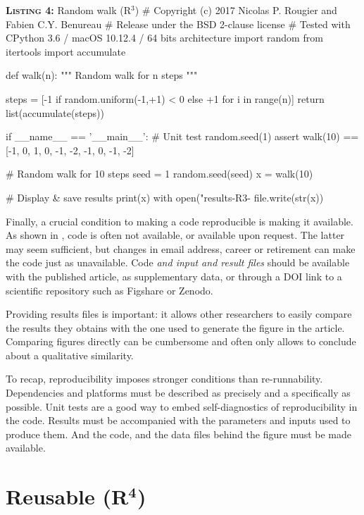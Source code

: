 \documentclass[a4paper,11pt]{article}
\begin{document}

\begin{code}{\textbf{\textsc{Listing 4:}} Random walk (R$^3$)}
# Copyright (c) 2017 Nicolas P. Rougier and Fabien C.Y. Benureau
# Release under the BSD 2-clause license
# Tested with CPython 3.6 / macOS 10.12.4 / 64 bits architecture
import random
from itertools import accumulate

def walk(n):
    """ Random walk for n steps """
  
    steps = [-1 if random.uniform(-1,+1) < 0 else +1 for i in range(n)]
    return list(accumulate(steps))

if __name__ == '__main__':
    # Unit test
    random.seed(1)
    assert walk(10) == [-1, 0, 1, 0, -1, -2, -1, 0, -1, -2]

    # Random walk for 10 steps
    seed = 1
    random.seed(seed)
    x = walk(10)
    
    # Display & save results
    print(x)
    with open("results-R3-%
        file.write(str(x))
\end{code}

Finally, a crucial condition to making a code reproducible is making it available. As shown in \citep{Collberg:2016}, code is often not available, or available upon request. The latter may seem sufficient, but changes in email address,  career or retirement can make the code just as unavailable. Code \emph{and input and result files} should be available with the published article, as supplementary data, or through a DOI link to a scientific repository such as Figshare or Zenodo.

Providing results files is important: it allows other researchers to easily compare the results they obtains with the one used to generate the figure in the article. Comparing figures directly can be cumbersome and often only allows to conclude about a qualitative similarity.

To recap, reproducibility imposes stronger conditions than re-runnability. Dependencies and platforms must be described as precisely and a specifically as possible. Unit tests are a good way to embed self-diagnostics of reproducibility in the code. Results must be accompanied with the parameters and inputs used to produce them. And the code, and the data files behind the figure must be made available. 


\clearpage
\section*{Reusable (R$^{\mathbf 4}$)}
\end{document}
